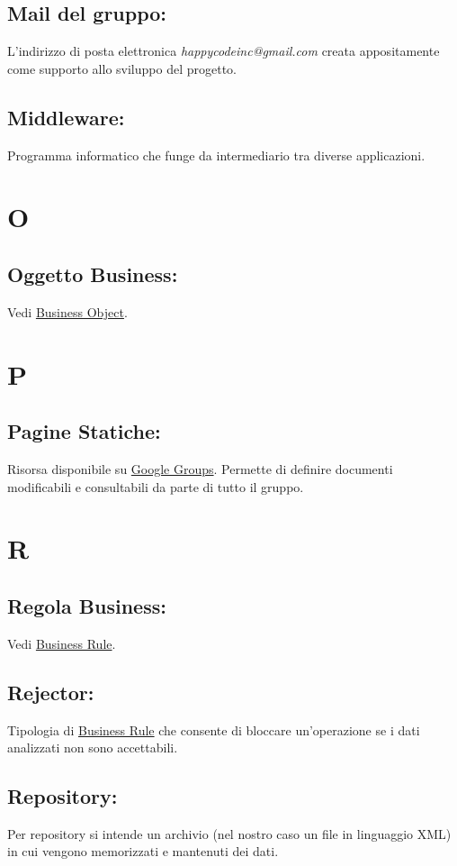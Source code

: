 \section{Mail del gruppo:}
L'indirizzo di posta elettronica \textit{happycodeinc@gmail.com} creata appositamente come supporto allo sviluppo del progetto.
\section{Middleware:}
Programma informatico che funge da intermediario tra diverse applicazioni.

\chapter{O}
\section{Oggetto Business:}
Vedi \hyperlink{Business Object}{Business Object}.

\chapter{P}
\section{Pagine Statiche:}
Risorsa disponibile su \hyperlink{Google Groups}{Google Groups}. Permette di definire documenti modificabili e consultabili da parte di tutto il gruppo.

\chapter{R}
\section{Regola Business:}
Vedi \hyperlink{Business Rule}{Business Rule}.
\section{Rejector:}
Tipologia di \hyperlink{Business Rule}{Business Rule} che consente di bloccare un'operazione se i dati analizzati non sono accettabili.
\section{Repository:} 
Per repository si intende un archivio (nel nostro caso un file in linguaggio XML) in cui vengono memorizzati e mantenuti dei dati.
